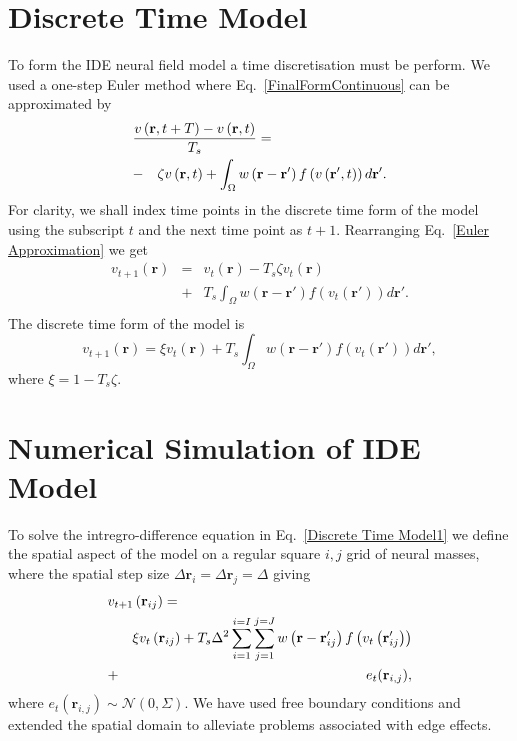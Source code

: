 \documentclass[12pt]{iopart}
\begin{document}
\section{Discrete Time Model}\label{Time Discretization} To form the IDE neural field model a time discretisation must be perform. We used a one-step Euler method where Eq.~\ref{FinalFormContinuous} can be approximated by 
\begin{eqnarray}
	\label{Euler Approximation} \lefteqn{\frac{v\left( \mathbf{r},t+T \right) - v\left( \mathbf{r},t\right)}{T_s} =}\nonumber\\
& -&\zeta v\left( \mathbf{r},t \right) + \int_\Omega {w\left( \mathbf{r}-\mathbf{r}' \right)f\left( {v\left( \mathbf{r}',t \right)} \right)d\mathbf{r}'}.\nonumber \\ 
\end{eqnarray}
For clarity, we shall index time points in the discrete time form of the model using the subscript $t$ and the next time point as $t+1$. Rearranging Eq.~\ref{Euler Approximation} we get 
\begin{eqnarray}
	\label{Euler Approximation2} v_{t+1}\left( \mathbf{r}\right) &=& v_t\left( \mathbf{r}\right) -T_s \zeta v_t\left( \mathbf{r}\right)\nonumber \\
&+& T_s \int_\Omega {w\left( \mathbf{r}-\mathbf{r}' \right)f\left( {v_t\left( \mathbf{r}'\right)} \right)d\mathbf{r}'}.\nonumber \\ 
\end{eqnarray}
The discrete time form of the model is 
\begin{equation}
	\label{Discrete Time Model1} v_{t+1}\left(\mathbf{r}\right) = \xi v_t\left(\mathbf{r}\right) + T_s \int_\Omega { w\left(\mathbf{r}-\mathbf{r}'\right) f\left(v_t\left(\mathbf{r}'\right)\right) d\mathbf{r}'}, 
\end{equation}
where $\xi = 1 - T_s \zeta$. 
\section{Numerical Simulation of IDE Model}\label{Space Discretization} To solve the intregro-difference equation in Eq.~\ref{Discrete Time Model1} we define the spatial aspect of the model on a regular square $i,j$ grid of neural masses, where the spatial step size $\Delta \mathbf{r}_i = \Delta \mathbf{r}_j = \Delta $ giving 
\begin{eqnarray}
	\label{discrete space} \lefteqn{v_{t+1}\left(\mathbf{r}_{ij}\right)=}\nonumber\\
&&\xi v_t\left(\mathbf{r}_{ij}\right)+T_s \Delta^2\sum_{i=1}^{i=I}{\sum_{j=1}^{j=J}{w\left(\mathbf{r}-\mathbf{r}_{ij}'\right)f\left( v_t\left( \mathbf{r}_{ij}'\right)\right)}}\nonumber\\
&+& e_t(\mathbf{r}_{i,j}), 
\end{eqnarray}
where $e_t(\mathbf{r}_{i,j}) \sim \mathcal{N}\left(0,\Sigma\right)$. We have used free boundary conditions and extended the spatial domain to alleviate problems associated with edge effects. 
\end{document}
